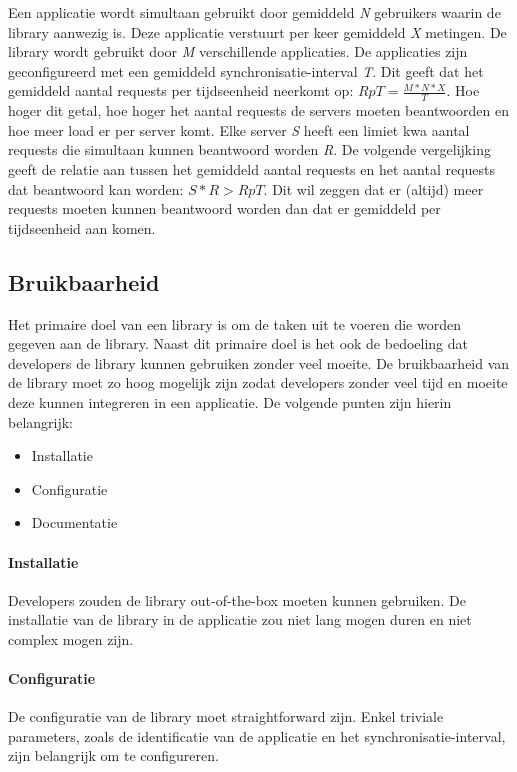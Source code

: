 \noindent Een applicatie wordt simultaan gebruikt door gemiddeld \textit{N} gebruikers waarin de library aanwezig is. Deze applicatie verstuurt per keer gemiddeld \textit{X} metingen. De library wordt gebruikt door \textit{M} verschillende applicaties. De applicaties zijn geconfigureerd met een gemiddeld synchronisatie-interval \textit{T}. Dit geeft dat het gemiddeld aantal requests per tijdseenheid neerkomt op: $RpT=\frac{M*N*X}{T}$. Hoe hoger dit getal, hoe hoger het aantal requests de servers moeten beantwoorden en hoe meer load er per server komt. Elke server \textit{S} heeft een limiet kwa aantal requests die simultaan kunnen beantwoord worden \textit{R}. De volgende vergelijking geeft de relatie aan tussen het gemiddeld aantal requests en het aantal requests dat beantwoord kan worden: $S*R > RpT$. Dit wil zeggen dat er (altijd) meer requests moeten kunnen beantwoord worden dan dat er gemiddeld per tijdseenheid aan komen.\\



\subsection{Bruikbaarheid}
Het primaire doel van een library is om de taken uit te voeren die worden gegeven aan de library. Naast dit primaire doel is het ook de bedoeling dat developers de library kunnen gebruiken zonder veel moeite. De bruikbaarheid van de library moet zo hoog mogelijk zijn zodat developers zonder veel tijd en moeite deze kunnen integreren in een applicatie. De volgende punten zijn hierin belangrijk: 
\begin{itemize}
\item Installatie
\item Configuratie
\item Documentatie
\end{itemize}

\paragraph{Installatie} Developers zouden de library out-of-the-box moeten kunnen gebruiken. De installatie van de library in de applicatie zou niet lang mogen duren en niet complex mogen zijn. \\

\paragraph{Configuratie} De configuratie van de library moet straightforward zijn. Enkel triviale parameters, zoals de identificatie van de applicatie en het synchronisatie-interval, zijn belangrijk om te configureren. \\

